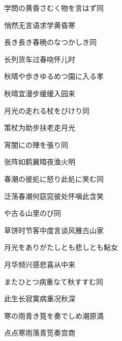 \begin{haiku}
    {\FH 学問の黄昏さむく物を言はず}\hfill{\FH 同}

    {\FK 悄然无言语求学黄昏寒}
\end{haiku}

\begin{haiku}
    {\FH 長き長き春暁のなつかしき}\hfill{\FH 同}

    {\FK 长列货车过春哓怀儿时}
\end{haiku}

\begin{haiku}
    {\FH 秋晴や歩きゆるめつ園に入る}\hfill{\FH 孝}

    {\FK 秋晴宜漫步缓缓入园来}
\end{haiku}

\begin{haiku}
    {\FH 月光の走れる杖をびけり}\hfill{\FH 同}

    {\FK 策杖为助步扶老走月光}
\end{haiku}

\begin{haiku}
    {\FH 宵闇にの陣を張り}\hfill{\FH 同}

    {\FK 张阵如鹤翼暗夜渔火明}
\end{haiku}

\begin{haiku}
    {\FH 春潮の彼処に怒り此処に笑む}\hfill{\FH 同}

    {\FK 泛荡春潮何窈窕彼处怀嗔此含笑}
\end{haiku}

\begin{haiku}
    {\FH {}や古る山里のび}\hfill{\FH 同}

    {\FK 草饼时节客中度言谈风雅古山家}
\end{haiku}

\begin{haiku}
    {\FH 月光をありがたしとも悲しとも}\hfill{\FH 鮎女}

    {\FK 月华频兴感悲喜从中来}
\end{haiku}

\begin{haiku}
    {\FH またひとつ病重なて秋すすむ}\hfill{\FH 同}

    {\FK 此生长寂寞病重况秋深}
\end{haiku}

\begin{haiku}
    {\FH 寒の雨青き筧を奏でしめ}\hfill{\FH 潮原満}

    {\FK 点点寒雨落青笕奏宫商}
\end{haiku}

